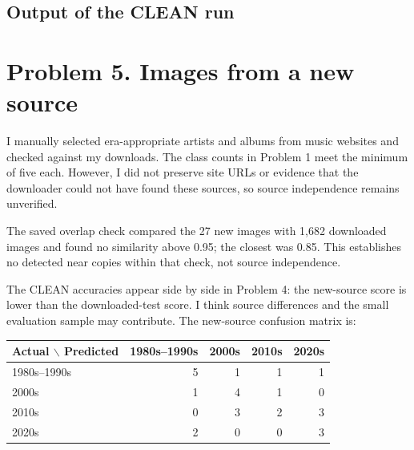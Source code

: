 \documentclass[11pt]{article}
\begin{document}
\subsection*{Output of the CLEAN run}

\section*{Problem 5. Images from a new source}
I manually selected era-appropriate artists and albums from music websites and checked against my downloads. The class counts in Problem 1 meet the minimum of five each. However, I did not preserve site URLs or evidence that the downloader could not have found these sources, so source independence remains unverified.

The saved overlap check compared the 27 new images with 1,682 downloaded images and found no similarity above 0.95; the closest was 0.85. This establishes no detected near copies within that check, not source independence.

The CLEAN accuracies appear side by side in Problem 4: the new-source score is lower than the downloaded-test score. I think source differences and the small evaluation sample may contribute. The new-source confusion matrix is:
\begin{center}
\begin{tabular}{lrrrr}\toprule
Actual $\backslash$ Predicted &1980s--1990s&2000s&2010s&2020s\\\midrule
1980s--1990s&5&1&1&1\\
2000s&1&4&1&0\\
2010s&0&3&2&3\\
2020s&2&0&0&3\\\bottomrule
\end{tabular}
\end{center}
\end{document}
